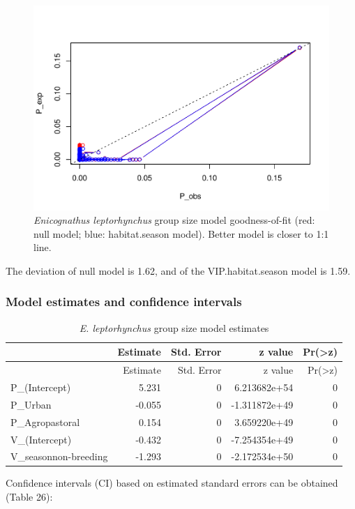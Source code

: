 \documentclass[]{article}
\begin{document}
\begin{figure}[H]
\includegraphics{Patagonia_parrots_density_analysis_files/figure-latex/unnamed-chunk-33-1} \caption{\textit{Enicognathus leptorhynchus} group size model goodness-of-fit (red: null model; blue: habitat.season model). Better model is closer to 1:1 line.}\label{fig:unnamed-chunk-33}
\end{figure}

The deviation of null model is 1.62, and of the VIP.habitat.season model
is 1.59.

\subsubsection{Model estimates and confidence
intervals}\label{model-estimates-and-confidence-intervals-1}

\begin{longtable}[]{@{}lrrrr@{}}
\caption{\textit{E. leptorhynchus} group size model
estimates}\tabularnewline
\toprule
& Estimate & Std. Error & z value &
Pr(\textgreater{}\textbar{}z\textbar{})\tabularnewline
\midrule
\endfirsthead
\toprule
& Estimate & Std. Error & z value &
Pr(\textgreater{}\textbar{}z\textbar{})\tabularnewline
\midrule
\endhead
P\_(Intercept) & 5.231 & 0 & 6.213682e+54 & 0\tabularnewline
P\_Urban & -0.055 & 0 & -1.311872e+49 & 0\tabularnewline
P\_Agropastoral & 0.154 & 0 & 3.659220e+49 & 0\tabularnewline
V\_(Intercept) & -0.432 & 0 & -7.254354e+49 & 0\tabularnewline
V\_seasonnon-breeding & -1.293 & 0 & -2.172534e+50 & 0\tabularnewline
\bottomrule
\end{longtable}

Confidence intervals (CI) based on estimated standard errors can be
obtained (Table 26):
\end{document}
